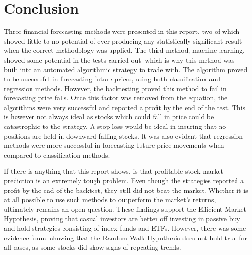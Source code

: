 \chapter{Conclusion}

Three financial forecasting methods were presented in this report, two of which showed little to no potential of ever producing any statistically significant result when the correct methodology was applied. The third method, machine learning, showed some potential in the tests carried out, which is why this method was built into an automated algorithmic strategy to trade with. The algorithm proved to be successful in forecasting future prices, using both classification and regression methods. However, the backtesting proved this method to fail in forecasting price falls. Once this factor was removed from the equation, the algorithms were very successful and reported a profit by the end of the test. This is however not always ideal as stocks which could fall in price could be catastrophic to the strategy. A stop loss would be ideal in insuring that no positions are held in downward falling stocks. It was also evident that regression methods were more successful in forecasting future price movements when compared to classification methods. 

If there is anything that this report shows, is that profitable stock market prediction is an extremely tough problem. Even though the strategies reported a profit by the end of the backtest, they still did not beat the market. Whether it is at all possible to use such methods to outperform the market's returns, ultimately remains an open question. These findings support the Efficient Market Hypothesis, proving that casual investors are better off investing in passive buy and hold strategies consisting of index funds and ETFs. However, there was some evidence found showing that the Random Walk Hypothesis does not hold true for all cases, as some stocks did show signs of repeating trends.